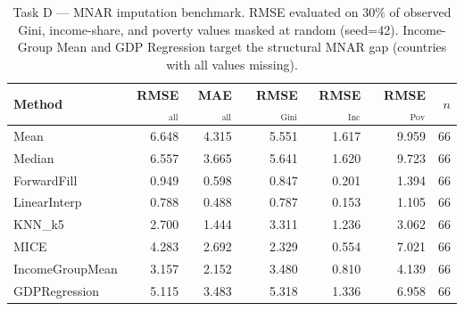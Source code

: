 \begin{table}[htbp]
\centering
\caption{Task D --- MNAR imputation benchmark. RMSE evaluated on $30\%$ of observed Gini, income-share, and poverty values masked at random (seed=42). Income-Group Mean and GDP Regression target the structural MNAR gap (countries with all values missing).}
\label{tab:taskD}
\begin{tabular}{lrrrrrr}
\toprule
Method & RMSE$_{\text{all}}$ & MAE$_{\text{all}}$ & RMSE$_{\text{Gini}}$ & RMSE$_{\text{Inc}}$ & RMSE$_{\text{Pov}}$ & $n$ \\
\midrule
Mean & 6.648 & 4.315 & 5.551 & 1.617 & 9.959 & 66 \\
Median & 6.557 & 3.665 & 5.641 & 1.620 & 9.723 & 66 \\
ForwardFill & 0.949 & 0.598 & 0.847 & 0.201 & 1.394 & 66 \\
LinearInterp & 0.788 & 0.488 & 0.787 & 0.153 & 1.105 & 66 \\
KNN\_k5 & 2.700 & 1.444 & 3.311 & 1.236 & 3.062 & 66 \\
MICE & 4.283 & 2.692 & 2.329 & 0.554 & 7.021 & 66 \\
IncomeGroupMean & 3.157 & 2.152 & 3.480 & 0.810 & 4.139 & 66 \\
GDPRegression & 5.115 & 3.483 & 5.318 & 1.336 & 6.958 & 66 \\
\bottomrule
\end{tabular}
\end{table}